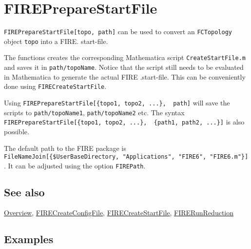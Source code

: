 \documentclass[../FeynHelpersManual.tex]{subfiles}
\begin{document}
\hypertarget{firepreparestartfile}{
\section{FIREPrepareStartFile}\label{firepreparestartfile}}

\texttt{FIREPrepareStartFile[\allowbreak{}topo,\ \allowbreak{}path]} can
be used to convert an \texttt{FCTopology} object \texttt{topo} into a
FIRE. start-file.

The functions creates the corresponding Mathematica script
\texttt{CreateStartFile.m} and saves it in \texttt{path/topoName}.
Notice that the script still needs to be evaluated in Mathematica to
generate the actual FIRE .start-file. This can be conveniently done
using \texttt{FIRECreateStartFile}.

Using
\texttt{FIREPrepareStartFile[\allowbreak{}\{\allowbreak{}topo1,\ \allowbreak{}topo2,\ \allowbreak{}...\},\ \allowbreak{} path]}
will save the scripts to \texttt{path/topoName1},
\texttt{path/topoName2} etc. The syntax
\texttt{FIREPrepareStartFile[\allowbreak{}\{\allowbreak{}topo1,\ \allowbreak{}topo2,\ \allowbreak{}...\},\ \allowbreak{} \{\allowbreak{}path1,\ \allowbreak{}path2,\ \allowbreak{}...\}]}
is also possible.

The default path to the FIRE package is
\texttt{FileNameJoin[\allowbreak{}\{\allowbreak{}\$UserBaseDirectory,\ \allowbreak{}"Applications",\ \allowbreak{}"FIRE6",\ \allowbreak{}"FIRE6.m"\}]}.
It can be adjusted using the option \texttt{FIREPath}.

\subsection{See also}

\hyperlink{toc}{Overview},
\hyperlink{firecreateconfigfile}{FIRECreateConfigFile},
\hyperlink{firecreatestartfile}{FIRECreateStartFile},
\hyperlink{firerunreduction}{FIRERunReduction}

\subsection{Examples}
\end{document}
